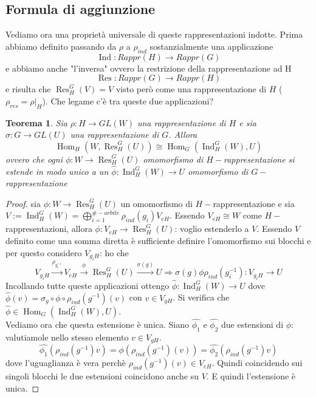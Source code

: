 \documentclass[11pt]{article}
\theoremstyle{plain}
\newtheorem{thm}{Teorema}[section]
\theoremstyle{definition}
\theoremstyle{remark}
\DeclareMathOperator{\Hom}{Hom}
\DeclareMathOperator{\Ind}{Ind}
\DeclareMathOperator{\Res}{Res}
\begin{document}
\subsection{Formula di aggiunzione}
Vediamo ora una proprietà universale di queste rappresentazioni indotte. Prima abbiamo definito passando da $\rho$ a $\rho_{ind}$ sostanzialmente una applicazione
\[\Ind:Rappr(H)\rightarrow Rappr(G)\]
e abbiamo anche "l'inversa" ovvero la restrizione della rappresentazione ad H
\[\Res:Rappr(G)\rightarrow Rappr(H)\]
e risulta che $\Res_H^G(V)=V$ visto però come una rappresentazione di $H$ ($\rho_{res}=\rho|_H$). Che legame c'è tra queste due applicazioni?
\begin{thm}
Sia $\rho:H\rightarrow GL(W)$ una rappresentazione di $H$ e sia $\sigma:G\rightarrow GL(U)$ una rappresentazione di $G$. Allora
\[\Hom_H(W,\Res_H^G(U))\cong \Hom_G(\Ind_H^G(W),U)\]
ovvero che ogni $\phi:W\rightarrow \Res_H^G(U)$ omomorfismo di $H-$rappresentazione si estende in modo unico a un $\hat{\phi}:\Ind_H^G(W)\rightarrow U$ omomorfismo di $G-$rappresentazione
\end{thm}
\begin{proof} sia $\phi:W\rightarrow \Res_H^G(U)$ un omomorfismo di $H-$rappresentazione e sia $V:=\Ind_H^G(W)=\bigoplus_{i=1}^{\#-orbite} \rho_{ind}(g_i)V_{eH}$. Essendo $V_{eH}\cong W$ come $H-$rappresentazioni, allora $\phi:V_{eH}\rightarrow \Res_H^G(U)$: voglio estenderlo a $V$. Essendo $V$ definito come una somma diretta è sufficiente definire l'omomorfismo sui blocchi e per questo considero $V_{g_iH}$: ho che
\[V_{g_iH}\overset{\rho_{g_i^{-1}}}{\rightarrow} V_{eH}\overset{\phi}{\rightarrow} \Res_H^G(U)\overset{\sigma(g)}{\rightarrow} U\Rightarrow \sigma(g)\phi\rho_{ind}(g_i^{-1}):V_{g_iH}\rightarrow U\]
Incollando tutte queste applicazioni ottengo $\hat{\phi}:\Ind_H^G(W)\rightarrow U$ dove
$\hat{\phi}(v)=\sigma_{g}\circ \phi\circ \rho_{ind}(g^{-1})(v)$ con $v\in V_{gH}$. Si verifica che $\hat{\phi}\in \Hom_G(\Ind_H^G(W),U)$. \\
Vediamo ora che questa estensione è unica. Siano $\hat{\phi_1}$ e $\hat{\phi_2}$ due estensioni di $\phi$: valutiamole nello stesso elemento $v\in V_{gH}$.
\[\hat{\phi_1}(\rho_{ind}(g^{-1})v)=\phi(\rho_{ind}(g^{-1})(v))=\hat{\phi_2}(\rho_{ind}(g^{-1})v)\]
dove l'uguaglianza è vera perchè $\rho_{ind}(g^{-1})(v)\in V_{eH}$. Quindi coincidendo sui singoli blocchi le due estensioni coincidono anche su $V$. E quindi l'estensione è unica.


\end{proof}
\end{document}
